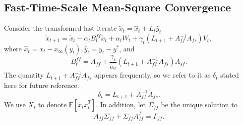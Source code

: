 \subsection{Fast-Time-Scale Mean-Square Convergence}\label{sec:fast_mse}
Consider the transformed last iterate $\tilde{x}_t = \hat{x}_t + L_t \hat{y}_t$ 
\begin{equation}\label{eq:fast_recursion}
    \tilde{x}_{t+1} = \tilde{x}_t - \alpha_t B_t^{ff} \tilde{x}_t + \alpha_t W_t + \gamma_t (L_{t+1} + A_{ff}^{-1}A_{fs} ) V_t ,   
\end{equation}
where $\hat{x}_t = x_t - x_\infty (y_t), \hat{y}_t = y_t - y^*$, and 
\begin{equation}\label{eq:Bt_ff}
    B_t^{ff} = A_{ff} + \frac{\gamma_t}{\alpha_t}(L_{t+1} + A_{ff}^{-1} A_{fs}) A_{sf} .
\end{equation}
The quantity $L_{t+1} + A_{ff}^{-1} A_{fs}$ appears frequently, so we refer to it as $\delta_t$ stated here for future reference:
\begin{equation}\label{eq:delta}
    \delta_t = L_{t+1} + A_{ff}^{-1} A_{fs}.
\end{equation}
We use $X_t$ to denote $\mathbb{E}[\tilde{x}_t \tilde{x}_t^T]$. In addition,  let $\Sigma_{ff}$ be the unique solution to 
\begin{equation}\label{eq:fast_covariance}
        A_{ff} \Sigma_{ff} + \Sigma_{ff} A_{ff}^T = \Gamma_{ff}.
    \end{equation}
